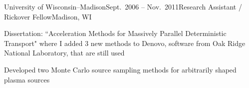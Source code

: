 \begin{rSubsection}{University of Wisconsin--Madison}{Sept.\ 2006 -- Nov.\ 2011}{Research Assistant / Rickover Fellow}{Madison, WI}
\item Dissertation: ``Acceleration Methods for Massively Parallel Deterministic Transport" where I added 3 new methods to Denovo, software from Oak Ridge National Laboratory, that are still used%
\item Developed two Monte Carlo source sampling methods for arbitrarily shaped plasma sources%
\end{rSubsection}





